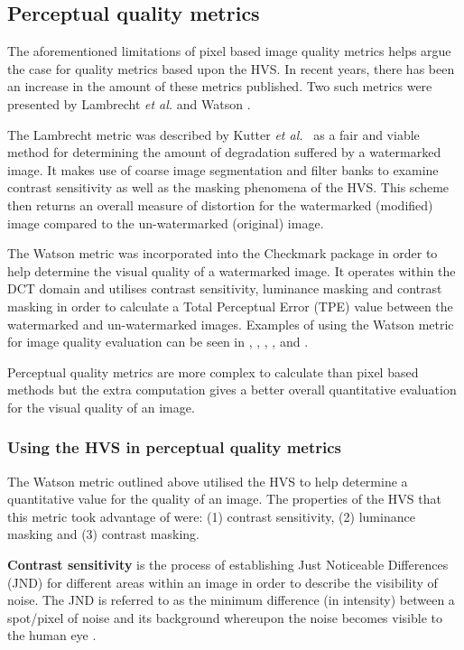 \documentclass[12pt]{report}
\begin{document}
\subsection{Perceptual quality metrics}
\label{perceptualMetrics}
The aforementioned limitations of pixel based image quality metrics helps argue the case for 
quality metrics based upon the HVS. In recent years, there has been an increase in the amount 
of these metrics published. Two such metrics were presented by Lambrecht \emph{et al.} \cite{lamb} 
and Watson \cite{watsonmetric}. 

The Lambrecht metric was described by Kutter \emph{et al.}~\cite{petit99} as a 
fair and viable method for determining the amount 
of degradation suffered by a watermarked image.
It makes use of coarse image segmentation and filter banks to 
examine contrast sensitivity as well as
the masking phenomena of the HVS.  This scheme then returns an overall measure of distortion
for the watermarked (modified) image compared to the un-watermarked (original) image.

The Watson metric was incorporated into the Checkmark package \cite{checkmark} in order to 
help determine the visual quality of a watermarked image.
It operates within the DCT domain and utilises 
contrast sensitivity, luminance masking and
contrast masking in order to calculate a Total Perceptual Error (TPE) value 
between the watermarked and un-watermarked images.
Examples of using the Watson metric for image quality evaluation can be seen in
\cite{volo2nd}, \cite{mayacheDI}, \cite{meerAtt}, \cite{chenwat}, \cite{rodwat} and \cite{planwat}.

Perceptual quality metrics are more complex to calculate than pixel based methods
but the extra computation gives a better overall quantitative evaluation for the visual
quality of an image.

\subsubsection{Using the HVS in perceptual quality metrics}
The Watson metric outlined above utilised the HVS to help determine a 
quantitative value for the quality of an image. The properties of the HVS that this metric 
took advantage of were: (1) contrast sensitivity, (2) luminance masking and (3) contrast masking.

{\bf Contrast sensitivity} is the process of establishing Just Noticeable Differences (JND) for different
areas within an image in order to describe the visibility of noise. 
The JND is referred to as the minimum difference (in intensity) between a spot/pixel of noise and its background
whereupon the noise becomes visible to the human eye \cite{meerMasters}. 
\end{document}
